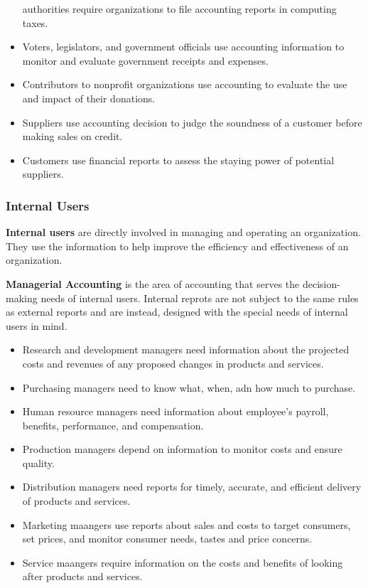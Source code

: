 \documentclass[../main.tex]{subfiles}
\begin{document}
\begin{itemize}[noitemsep]
		authorities require organizations to file accounting reports in 
		computing taxes.
		\item Voters, legislators, and government officials use accounting 
		information to monitor and evaluate government receipts and expenses. 
		\item Contributors to nonprofit organizations use accounting to 
		evaluate the use and impact of their donations.
		\item Suppliers use accounting decision to judge the soundness of a 
		customer before making sales on credit. 
		\item Customers use financial reports to assess the staying power of 
		potential suppliers. 
	\end{itemize}
	
	\subsubsection{Internal Users}
	
	\textbf{Internal users} are directly involved in managing and operating an 
	organization. They use the information to help improve the efficiency and 
	effectiveness of an organization.
	
	\textbf{Managerial Accounting} is the area of accounting that serves the 
	decision-making needs of internal users. Internal reprots are not subject 
	to the same rules as external reports and are instead, designed with the 
	special needs of internal users in mind. 
	\begin{itemize}[noitemsep]
		\item Research and development managers need information about the 
		projected costs and revenues of any proposed changes in products and 
		services.
		\item Purchasing managers need to know what, when, adn how much to 
		purchase.
		\item Human resource managers need information about employee's 
		payroll, benefits, performance, and compensation.
		\item Production managers depend on information to monitor costs and 
		ensure quality. 
		\item Distribution managers need reports for timely, accurate, and 
		efficient delivery of products and services. 
		\item Marketing maangers use reports about sales and costs to target 
		consumers, set prices, and monitor consumer needs, tastes and price 
		concerns.
		\item Service maangers require information on the costs and benefits of 
		looking after products and services.
	\end{itemize}
	
\end{document}
